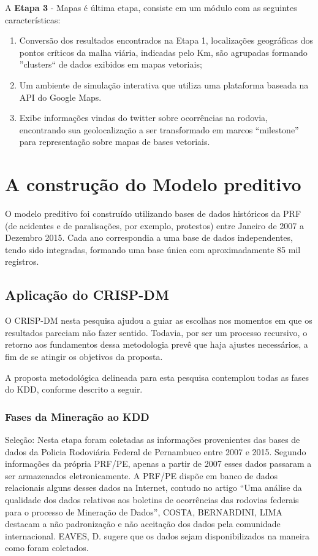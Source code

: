 A \textbf{Etapa 3} - Mapas é última etapa, consiste em um módulo com as seguintes características:
  \begin{enumerate}
    \item Conversão dos resultados encontrados na Etapa 1, localizações geográficas dos pontos críticos da malha viária, indicadas pelo Km, são agrupadas formando ''clusters`` de dados exibidos em mapas vetoriais;
    
    \item Um ambiente de simulação interativa que utiliza uma plataforma baseada na API do Google Maps.
    
    \item Exibe informações vindas do twitter sobre ocorrências na rodovia, encontrando sua geolocalização a ser transformado em marcos ``milestone'' para representação sobre mapas de bases vetoriais.
  \end{enumerate}
 
\pagebreak 

\section{A construção do Modelo preditivo}

O modelo preditivo foi construído utilizando bases de dados históricos da PRF (de acidentes e de paralisações, por exemplo,  protestos) entre Janeiro de 2007 a Dezembro 2015. Cada ano correspondia a uma base de dados independentes, tendo sido integradas, formando uma base única com aproximadamente 85 mil registros. 


\subsection{Aplicação do CRISP-DM}
O CRISP-DM nesta pesquisa ajudou a guiar as escolhas nos momentos em que os resultados pareciam não fazer sentido. Todavia, por ser um processo recursivo, o retorno aos fundamentos dessa metodologia prevê que haja ajustes necessários, a fim de se atingir os objetivos da proposta.

A proposta metodológica delineada para esta pesquisa contemplou todas as fases do KDD, conforme descrito a seguir.

\subsubsection{Fases da Mineração ao KDD}

Seleção: Nesta etapa foram coletadas as informações provenientes das bases de dados da Policia Rodoviária Federal de Pernambuco entre 2007 e 2015. Segundo informações da própria PRF/PE, apenas a partir de 2007 esses dados passaram a ser armazenados eletronicamente. A PRF/PE dispõe em banco de dados relacionais alguns desses dados na Internet,
contudo no artigo “Uma análise da qualidade dos dados relativos aos boletins de ocorrências das rodovias federais para
o processo de Mineração de Dados”, COSTA, BERNARDINI, LIMA \cite{Costa2015} destacam a não padronização e não aceitação dos
dados pela comunidade internacional. EAVES, D. \cite{Eaves} sugere que os dados sejam disponibilizados na maneira como foram
coletados. 

